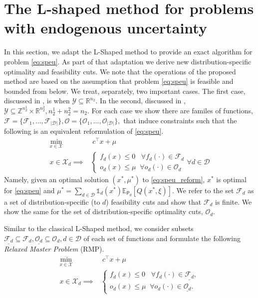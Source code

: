 \documentclass[12pt]{article}
\theoremstyle{thmstylethree}%
\newcommand{\mtc}[1] {\mathcal{#1}}
\newcommand{\pr}[1]{\ensuremath{\mathsf{#1}}}
\def\R{\ensuremath{\mathbb{R}}}
\def\Ex{\ensuremath{\mathbb{E}}}
\def\Ind{\ensuremath{\mathbb{1}}}
\begin{document}
\section{The L-shaped method for problems with endogenous uncertainty}
\label{sec:benders}
In this section, we adapt the L-Shaped method to provide an exact algorithm for problem \eqref{eq:speu}. As part of that adaptation we derive new distribution-specific optimality and feasibility cuts.  We note that the operations of the proposed method are based on the assumption that problem \eqref{eq:speu} is feasible and bounded from below. We treat, separately, two important cases. The first case, discussed in , is when $\mtc{Y}\subseteq \R^{n_2}$. In the second, discussed in ,  $\mathcal{Y}\subseteq\mathbb{Z}^{n_2^1}\times \R^{n_2^2}, n_2^1+n_2^2=n_2$.  For each case we show there are familes of functions, $\mtc{F} = \{\mtc{F}_{1},\ldots,\mtc{F}_{\vert \mtc{D} \vert} \}, \mtc{O} = \{\mtc{O}_{1},\ldots,\mtc{O}_{\vert \mtc{D} \vert} \},$ that induce constraints such that the following is an equivalent reformulation of \eqref{eq:speu}.
\begin{subequations}\label{eq:speu_reform}
\begin{align}
     \min_{x\in \mtc{X}} & ~c^\top x+\mu \\
     x \in \mtc{X}_{d}  \implies &
     \begin{cases}
     	f_{d}(x) \leq 0 \;\;\; \forall f_{d}(\cdot) \in \mtc{F}_{d} \\
	o_{d}(x) \leq \mu \;\; \forall o_{d}(\cdot) \in \mtc{O}_{d}
     \end{cases} \forall d\in\mtc{D}
\end{align}
\end{subequations}
Namely, given an optimal solution $(x^*,\mu^*)$ to \eqref{eq:speu_reform}, $x^*$ is optimal for \eqref{eq:speu} and $\mu^* = \sum_{d\in\mtc{D}}\Ind_d(x^*)\Ex_{\pr{P}_d}[Q(x^*,\xi)].$ We refer to the set $\mtc{F}_{d}$ as a set of distribution-specific (to $d$) feasibility cuts and show that $\mtc{F}_{d}$ is finite. We show the same for the set of distribution-specific optimality cuts, $\mtc{O}_{d}.$ 

Similar to the classical L-Shaped method, we consider subsets $\underline{\mtc{F}_{d}} \subseteq \mtc{F}_{d}, \underline{\mtc{O}_{d}} \subseteq \mtc{O}_{d}, d \in \mtc{D}$ of each set of functions and formulate the following \textit{Relaxed Master Problem} (RMP).
\begin{subequations}\label{eq:rmp}
\begin{align}
     \min_{x\in \mtc{X}} & ~c^\top x+\mu \\
     \label{eq:rmp:imp}x \in \mtc{X}_{d}  \implies &
     \begin{cases}
     	f_{d}(x) \leq 0 \;\;\; \forall f_{d}(\cdot) \in \underline{\mtc{F}_{d}}, \\
	o_{d}(x) \leq \mu \;\; \forall o_{d}(\cdot) \in \underline{\mtc{O}_{d}}.
     \end{cases}
\end{align}
\end{subequations}
\end{document}

